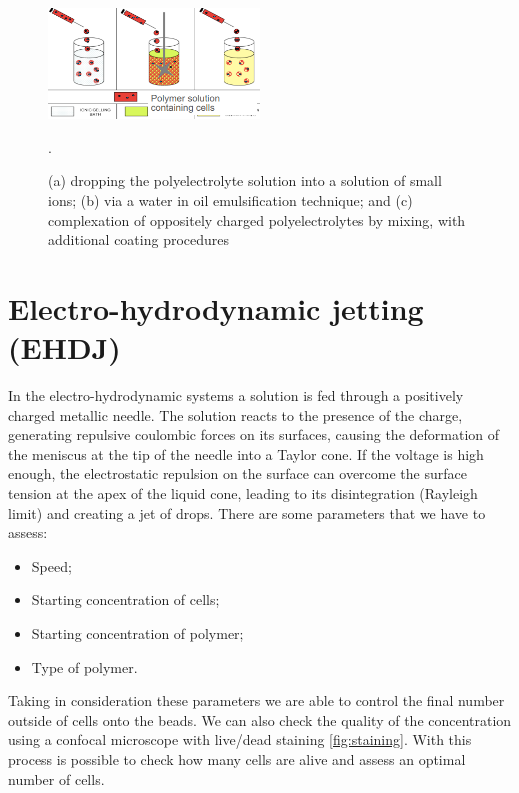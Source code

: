 \begin{figure}[H]
        \centering
        \includegraphics[width=0.5\textwidth]{encapsulation.png}
        \caption{\label{fig:encapsulation} (a) dropping the polyelectrolyte solution into a solution of small ions; (b) via a water in oil emulsification technique; and (c) complexation of oppositely charged polyelectrolytes by mixing, with additional coating procedures}.
\end{figure}

\section{Electro-hydrodynamic jetting (EHDJ)}

In the electro-hydrodynamic systems a solution is fed through a positively charged metallic needle. The solution reacts to the presence of the charge, generating repulsive coulombic forces on its surfaces, causing the deformation of the meniscus at the tip of the needle into a Taylor cone. If the voltage is high enough, the electrostatic repulsion on the surface can overcome the surface tension at the apex of the liquid cone, leading to its disintegration (Rayleigh limit) and creating a jet of drops.
There are some parameters that we have to assess:

\begin{multicols}{2}
    \begin{itemize}
        \item Speed;
        \item Starting concentration of cells;
        \item Starting concentration of polymer;
        \item Type of polymer.
    \end{itemize}
\end{multicols}

Taking in consideration these parameters we are able to control the final number outside of cells onto the beads. We can also check the quality of the concentration using a confocal microscope with live/dead staining \ref{fig:staining}. With this process is possible to check how many cells are alive and assess an optimal number of cells.

